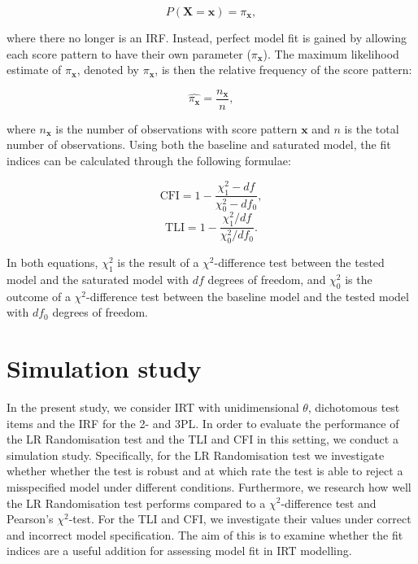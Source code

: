 \documentclass[Royal,sageapa,times,doublespace]{Manuscript-Files/sagej}
\begin{document}
\begin{equation}
P(\boldsymbol{X} = \boldsymbol{x}) = \pi_{\boldsymbol{x}},
\end{equation}

where there no longer is an IRF. Instead, perfect model fit is gained by allowing each score pattern to have their own parameter ($\pi_{\boldsymbol{x}}$). The maximum likelihood estimate of $\pi_{\boldsymbol{x}}$, denoted by $\hat{\pi_{\boldsymbol{x}}}$, is then the relative frequency of the score pattern:

\begin{equation*}
\hat{\pi_{\boldsymbol{x}}} = \frac{n_{\boldsymbol{x}}}{n},
\end{equation*}

where $n_{\boldsymbol{x}}$ is the number of observations with score pattern $\boldsymbol{x}$ and $n$ is the total number of observations. Using both the baseline and saturated model, the fit indices can be calculated through the following formulae:

\begin{equation}
\text{CFI} = 1 - \frac{\chi^{2}_{1} - df}{\chi^{2}_{0} - df_0},
\end{equation}
\begin{equation}
\text{TLI} = 1 - \frac{\chi^{2}_{1}/df}{\chi^{2}_{0}/df_0}.
\end{equation}

In both equations, $\chi^{2}_{1}$ is the result of a $\chi^2$-difference test between the tested model and the saturated model with $df$ degrees of freedom, and $\chi^{2}_{0}$ is the outcome of a $\chi^2$-difference test between the baseline model and the tested model with $df_0$ degrees of freedom.

\section{Simulation study}

In the present study, we consider IRT with unidimensional $\theta$, dichotomous test items and the IRF for the 2- and 3PL. In order to evaluate the performance of the LR Randomisation test and the TLI and CFI in this setting, we conduct a simulation study. Specifically, for the LR Randomisation test we investigate whether whether the test is robust and at which rate the test is able to reject a misspecified model under different conditions. Furthermore, we research how well the LR Randomisation test performs compared to a $\chi^2$-difference test and Pearson's $\chi^2$-test. For the TLI and CFI, we investigate their values under correct and incorrect model specification. The aim of this is to examine whether the fit indices are a useful addition for assessing model fit in IRT modelling.
\end{document}
